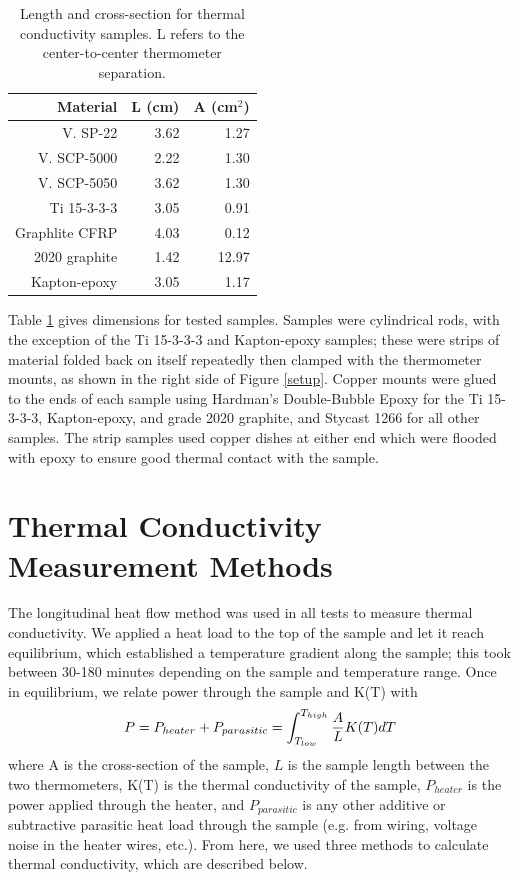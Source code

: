 \documentclass[final]{svjour2}
\begin{document}
\begin{table}[htb]
\centering
\begin{tabular}{rrr}
\toprule
\textbf{Material} & L (cm) & A (cm$^2$) \\\midrule
V. SP-22 & 3.62 & 1.27 \\
V. SCP-5000 & 2.22 & 1.30 \\
V. SCP-5050 & 3.62 & 1.30 \\
Ti 15-3-3-3 & 3.05 & 0.91 \\
Graphlite CFRP & 4.03 & 0.12 \\
2020 graphite & 1.42 & 12.97 \\
Kapton-epoxy & 3.05 & 1.17 \\
\bottomrule
\end{tabular}
\caption{{\small Length and cross-section for thermal conductivity samples. L refers to the center-to-center thermometer separation.}}
\label{dim}
\end{table}

Table \ref{dim} gives dimensions for tested samples. Samples were cylindrical rods, with the exception of the Ti 15-3-3-3 and Kapton-epoxy samples; these were strips of material folded back on itself repeatedly then clamped with the thermometer mounts, as shown in the right side of Figure \ref{setup}. Copper mounts were glued to the ends of each sample using Hardman's Double-Bubble Epoxy for the Ti 15-3-3-3, Kapton-epoxy, and grade 2020 graphite, and Stycast 1266 for all other samples. The strip samples used copper dishes at either end which were flooded with epoxy to ensure good thermal contact with the sample.

\section{Thermal Conductivity Measurement Methods}
The longitudinal heat flow method was used in all tests to measure thermal conductivity. We applied a heat load to the top of the sample and let it reach equilibrium, which established a temperature gradient along the sample; this took between 30-180 minutes depending on the sample and temperature range. Once in equilibrium, we relate power through the sample and K(T) with
\begin{equation}
P = P_{heater} + P_{parasitic} = \int_{T_{low}}^{T_{high}} \frac{A}{L} K(T)dT\\
\label{heat_flow}
\end{equation}
where A is the cross-section of the sample, $L$ is the sample length between the two thermometers, K(T) is the thermal conductivity of the sample, $P_{heater}$ is the power applied through the heater, and $P_{parasitic}$ is any other additive or subtractive parasitic heat load through the sample (e.g. from wiring, voltage noise in the heater wires, etc.). From here, we used three methods to calculate thermal conductivity, which are described below.
\end{document}

